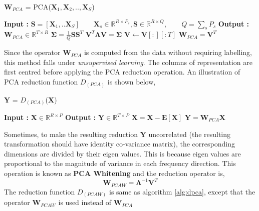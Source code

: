 \begin{algorithm}
  \caption{$\textbf{W}_{PCA}$ = PCA($\textbf{X}_{1}, \textbf{X}_{2},..,\textbf{X}_{S}$)}\label{alg:pca}
  \begin{algorithmic}[1]
    \Statex \textbf{Input :} $\textbf{S} = [\textbf{X}_{1},..\textbf{X}_{S}] \qquad \textbf{X}_{s} \in \mathbb{R}^{R \times P_{s}}, \textbf{S} \in \mathbb{R}^{R \times Q},\qquad  Q = \displaystyle\sum_{s}{P_{s}}$
    \Statex \textbf{Output :} $\textbf{W}_{PCA} \in \mathbb{R}^{T \times R}$
      \State $\bm{\Sigma} = \frac{1}{Q}\textbf{S}\textbf{S}^{T}$ 
      \State $\textbf{V}^{T} \bm{\Lambda} \textbf{V} = \bm{\Sigma}$ 
      \State $\textbf{V} \leftarrow \textbf{V}[:][:T]$ 
      \State $\textbf{W}_{PCA} = \textbf{V}^{T}$
  \end{algorithmic}
\end{algorithm}
\FloatBarrier

\noindent Since the operator $\textbf{W}_{PCA}$ is computed from the data without requiring labelling, this method falls under \textit{unsupervised learning}. The columns of representation are first centred before applying the PCA reduction operation. An illustration of PCA reduction function $D_{(PCA)}$ is shown below,

\begin{algorithm}
  \caption{$\textbf{Y}$ = $D_{(PCA)}$($\textbf{X}$)}\label{alg:dpca}
  \begin{algorithmic}[1]
    \Statex \textbf{Input :} $\textbf{X} \in \mathbb{R}^{R \times P}$
    \Statex \textbf{Output :} $\textbf{Y} \in \mathbb{R}^{T \times P}$
	\State $\textbf{\^X} = \textbf{X} - \textbf{E}[\textbf{X}]$
	\State $\textbf{Y} = \textbf{W}_{PCA}\textbf{\^X}$
  \end{algorithmic}
\end{algorithm}
\FloatBarrier

\noindent Sometimes, to make the resulting reduction $\textbf{Y}$ uncorrelated (the resulting transformation should have identity co-variance matrix), the corresponding dimensions are divided by their eigen values. This is because eigen values are proportional to the magnitude of variance in each frequency direction. This operation is known as \textbf{PCA Whitening} and the reduction operator is,
\[
\textbf{W}_{PCAW} = \bm{\Lambda}^{-1}\textbf{\^V}^{T}
\]    
The reduction function $D_{(PCAW)}$ is same as algorithm \ref{alg:dpca}, except that the operator $\textbf{W}_{PCAW}$ is used instead of $\textbf{W}_{PCA}$
\bigskip

